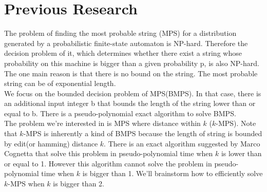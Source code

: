 \documentclass{article}
\theoremstyle{plain}
\theoremstyle{definition}
\theoremstyle{remark}
\begin{document}
\section{Previous Research}

The problem of finding the most probable string (MPS) for a distribution generated by a probabilistic finite-state automaton is NP-hard.\cite{de2013most, de2013computing} Therefore the decision problem of it, which determines whether there exist a string whose probability on this machine is bigger than a given probability p, is also NP-hard. The one main reason is that there is no bound on the string. The most probable string can be of exponential length.\cite{de2013most, de2013computing}\\

We focus on the bounded decision problem of MPS(BMPS). In that case, there is an additional input integer b that bounds the length of the string lower than or equal to b. There is a pseudo-polynomial exact algorithm to solve BMPS.\cite{de2013most, de2013computing}\\

The problem we're interested in is MPS where distance within $k$ ($k$-MPS). Note that $k$-MPS is inherently a kind of BMPS because the length of string is bounded by edit(or hamming) distance $k$. There is an exact algorithm suggested by Marco Cognetta that solve this problem in pseudo-polynomial time when $k$ is lower than or equal to 1. However this algorithm cannot solve the problem in pseudo-polynomial time when $k$ is bigger than 1. We'll brainstorm how to efficiently solve $k$-MPS when $k$ is bigger than 2.
\end{document}
